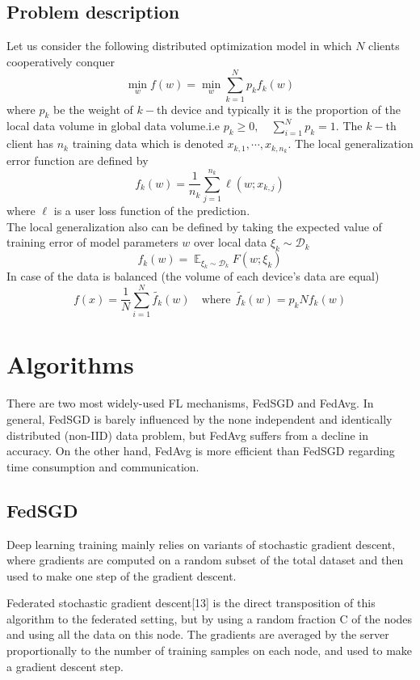 \documentclass{article}
\DeclareMathOperator{\E}{\mathbb{E}}
\theoremstyle{theorem}
\theoremstyle{definition}
\begin{document}
	\subsection{Problem description}
	Let us consider the following distributed optimization model in which $N$ clients cooperatively conquer   $$\min_{w} f(w) = \min_{w} \sum_{k=1}^{N} p_k f_k(w)$$
	where $p_k$ be the weight of $k-$th device and typically it is the proportion of the local data volume in global data volume.i.e $p_k \ge 0, \quad  \sum_{i=1}^{N}p_k=1.$ The $k-$th client has $n_k$ training data which is denoted $x_{k,1} , \cdots,  x_{k,n_k}.$ The local generalization error function are defined by $$f_k(w)= \frac{1}{n_k} \sum_{j=1}^{n_k} \ell (w;x_{k,j})$$
	where $\ell$ is a user loss function of the prediction.\\
	The local generalization also can be defined by taking the expected value of training error of model parameters $w$ over local data $\xi_k \sim \mathcal{D}_k$ $$f_k(w)=\E_{\xi_k \sim \mathcal{D}_k} F(w; \xi_k)$$
	In case of the data is balanced (the volume of each device's data are equal) $$f(x)=\frac{1}{N}  \sum_{i=1}^{N} \tilde{f_k}(w) \quad \text{where} \ \ \tilde{f_k}(w) =p_kNf_k(w)$$
	\section{Algorithms}
	There are two most widely-used FL mechanisms, FedSGD and FedAvg. In general, FedSGD is barely influenced by the none
	independent and identically distributed (non-IID) data problem, but FedAvg suffers from a decline in accuracy. On the other hand, FedAvg is more efficient than FedSGD regarding time consumption and communication.
	\subsection{FedSGD}
Deep learning training mainly relies on variants of stochastic gradient descent, where gradients are computed on a random subset of the total dataset and then used to make one step of the gradient descent.

Federated stochastic gradient descent[13] is the direct transposition of this algorithm to the federated setting, but by using a random fraction C of the nodes and using all the data on this node. The gradients are averaged by the server proportionally to the number of training samples on each node, and used to make a gradient descent step.
\end{document}
